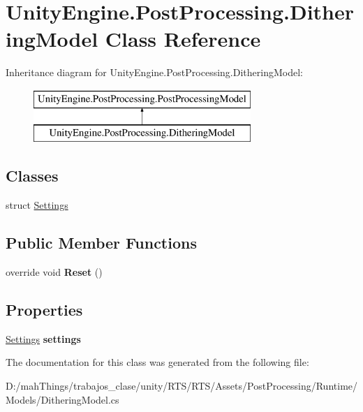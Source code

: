 \hypertarget{class_unity_engine_1_1_post_processing_1_1_dithering_model}{}\section{Unity\+Engine.\+Post\+Processing.\+Dithering\+Model Class Reference}
\label{class_unity_engine_1_1_post_processing_1_1_dithering_model}
Inheritance diagram for Unity\+Engine.\+Post\+Processing.\+Dithering\+Model\+:\begin{figure}[H]
\begin{center}
\leavevmode
\includegraphics[height=2.000000cm]{class_unity_engine_1_1_post_processing_1_1_dithering_model}
\end{center}
\end{figure}
\subsection*{Classes}
\begin{DoxyCompactItemize}
\item 
struct \mbox{\hyperlink{struct_unity_engine_1_1_post_processing_1_1_dithering_model_1_1_settings}{Settings}}
\end{DoxyCompactItemize}
\subsection*{Public Member Functions}
\begin{DoxyCompactItemize}
\item 
\mbox{\label{class_unity_engine_1_1_post_processing_1_1_dithering_model_a32230e9d0e5db63630764379fe5eb09e}} 
override void {\bfseries Reset} ()
\end{DoxyCompactItemize}
\subsection*{Properties}
\begin{DoxyCompactItemize}
\item 
\mbox{\label{class_unity_engine_1_1_post_processing_1_1_dithering_model_a5907987a25dc4f7f459cdafe704a0441}} 
\mbox{\hyperlink{struct_unity_engine_1_1_post_processing_1_1_dithering_model_1_1_settings}{Settings}} {\bfseries settings}
\end{DoxyCompactItemize}


The documentation for this class was generated from the following file\+:\begin{DoxyCompactItemize}
\item 
D\+:/mah\+Things/trabajos\+\_\+clase/unity/\+R\+T\+S/\+R\+T\+S/\+Assets/\+Post\+Processing/\+Runtime/\+Models/Dithering\+Model.\+cs\end{DoxyCompactItemize}
